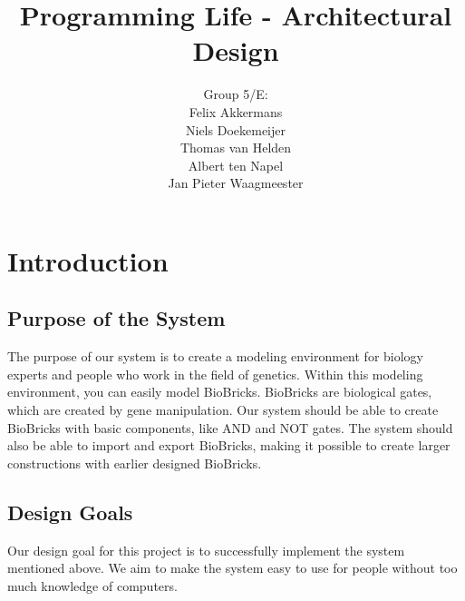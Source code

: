 \documentclass[a4paper]{article}
\title{Programming Life - Architectural Design }
\author{Group 5/E:\\
Felix Akkermans \\
Niels Doekemeijer \\
Thomas van Helden \\
Albert ten Napel \\
Jan Pieter Waagmeester}
\begin{document}
\maketitle

\vfill

\small{\tableofcontents}
\pagebreak
\section{Introduction}
\subsection{Purpose of the System}
The purpose of our system is to create a modeling environment for biology experts and people who work in the field of genetics. Within this modeling environment, you can easily model BioBricks. BioBricks are biological gates, which are created by gene manipulation. Our system should be able to create BioBricks with basic components, like AND and NOT gates. The system should also be able to import and export BioBricks, making it possible to create larger constructions with earlier designed BioBricks.

\subsection{Design Goals}
Our design goal for this project is to successfully implement the system mentioned above. We aim to make the system easy to use for people without too much knowledge of computers.
\end{document}
